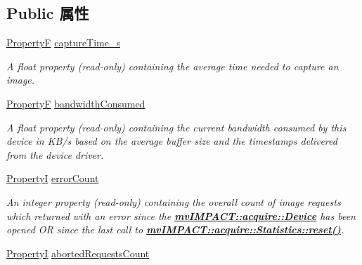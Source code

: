 \subsection*{Public 属性}
\begin{DoxyCompactItemize}
\item 
\hyperlink{group___common_interface_gaf54865fe5a3d5cfd15f9a111b40d09f9}{Property\+F} \hyperlink{classmv_i_m_p_a_c_t_1_1acquire_1_1_statistics_a0f67a746f45715fcb71fc36dfe0bd286}{capture\+Time\+\_\+s}
\begin{DoxyCompactList}\small\item\em A float property {\bfseries }(read-\/only) containing the average time needed to capture an image. \end{DoxyCompactList}\item 
\hyperlink{group___common_interface_gaf54865fe5a3d5cfd15f9a111b40d09f9}{Property\+F} \hyperlink{classmv_i_m_p_a_c_t_1_1acquire_1_1_statistics_a790d6e4e3e25b3bc11aa9fded463853e}{bandwidth\+Consumed}
\begin{DoxyCompactList}\small\item\em A float property {\bfseries }(read-\/only) containing the current bandwidth consumed by this device in K\+B/s based on the average buffer size and the timestamps delivered from the device driver. \end{DoxyCompactList}\item 
\hypertarget{classmv_i_m_p_a_c_t_1_1acquire_1_1_statistics_a238de49246362ad3594e9af8894628cc}{\hyperlink{group___common_interface_ga12d5e434238ca242a1ba4c6c3ea45780}{Property\+I} \hyperlink{classmv_i_m_p_a_c_t_1_1acquire_1_1_statistics_a238de49246362ad3594e9af8894628cc}{error\+Count}}\label{classmv_i_m_p_a_c_t_1_1acquire_1_1_statistics_a238de49246362ad3594e9af8894628cc}

\begin{DoxyCompactList}\small\item\em An integer property {\bfseries }(read-\/only) containing the overall count of image requests which returned with an error since the {\bfseries \hyperlink{classmv_i_m_p_a_c_t_1_1acquire_1_1_device}{mv\+I\+M\+P\+A\+C\+T\+::acquire\+::\+Device}} has been opened O\+R since the last call to {\bfseries \hyperlink{classmv_i_m_p_a_c_t_1_1acquire_1_1_statistics_adc21a9add6973f8f829f751e616b0a43}{mv\+I\+M\+P\+A\+C\+T\+::acquire\+::\+Statistics\+::reset()}}. \end{DoxyCompactList}\item 
\hypertarget{classmv_i_m_p_a_c_t_1_1acquire_1_1_statistics_a75c922d6e66abab66cc74be07ad514ff}{\hyperlink{group___common_interface_ga12d5e434238ca242a1ba4c6c3ea45780}{Property\+I} \hyperlink{classmv_i_m_p_a_c_t_1_1acquire_1_1_statistics_a75c922d6e66abab66cc74be07ad514ff}{aborted\+Requests\+Count}}\label{classmv_i_m_p_a_c_t_1_1acquire_1_1_statistics_a75c922d6e66abab66cc74be07ad514ff}


\end{DoxyCompactItemize}
